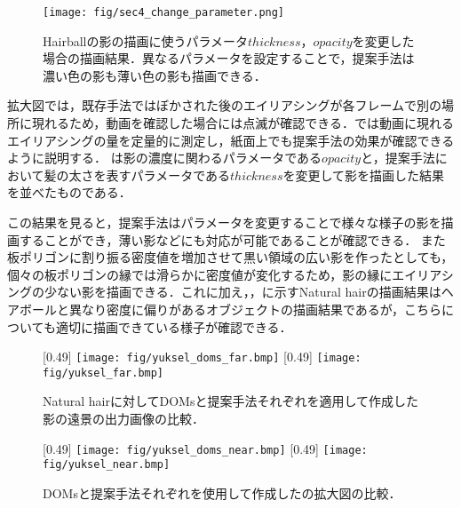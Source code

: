 %
\begin{figure}[htbp]
  \centering
    \texttt{[image: fig/sec4\_change\_parameter.png]}
    \caption{Hairballの影の描画に使うパラメータ$thickness$，$opacity$を変更した場合の描画結果．異なるパラメータを設定することで，提案手法は濃い色の影も薄い色の影も描画できる．}
    \label{fig:result_change_parameter}
\end{figure}\par
拡大図では，既存手法ではぼかされた後のエイリアシングが各フレームで別の場所に現れるため，動画を確認した場合には点滅が確認できる．では動画に現れるエイリアシングの量を定量的に測定し，紙面上でも提案手法の効果が確認できるように説明する．
%
は影の濃度に関わるパラメータである$opacity$と，提案手法において髪の太さを表すパラメータである$thickness$を変更して影を描画した結果を並べたものである．

この結果を見ると，提案手法はパラメータを変更することで様々な様子の影を描画することができ，薄い影などにも対応が可能であることが確認できる．
また板ポリゴンに割り振る密度値を増加させて黒い領域の広い影を作ったとしても，個々の板ポリゴンの縁では滑らかに密度値が変化するため，影の縁にエイリアシングの少ない影を描画できる．これに加え，，に示すNatural hairの描画結果はヘアボールと異なり密度に偏りがあるオブジェクトの描画結果であるが，こちらについても適切に描画できている様子が確認できる．%
\begin{figure}[h]
    \centering
        [0.49\linewidth]
            {\texttt{[image: fig/yuksel\_doms\_far.bmp]}}
        [0.49\linewidth]
            {\texttt{[image: fig/yuksel\_far.bmp]}}

    \caption{Natural hairに対してDOMsと提案手法それぞれを適用して作成した影の遠景の出力画像の比較．}
    \label{fig:yuksel_result_far}
\end{figure}
%
\begin{figure}[h]
    \centering
        [0.49\linewidth]
            {\texttt{[image: fig/yuksel\_doms\_near.bmp]}}
        [0.49\linewidth]
            {\texttt{[image: fig/yuksel\_near.bmp]}}

    \caption{DOMsと提案手法それぞれを使用して作成したの拡大図の比較．}
    \label{fig:yuksel_result_enlarge}
\end{figure}\\
%
